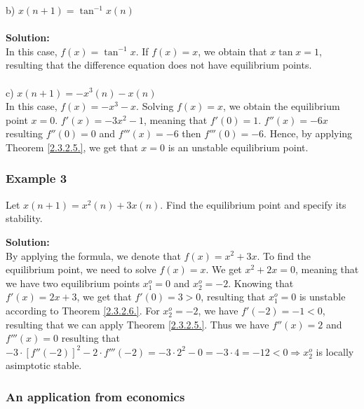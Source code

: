 \documentclass[a4paper,11pt]{report}
\begin{document}
b) $x(n+1)=\tan^{-1}{x(n)}$ \\ \\
\textbf{Solution:}\\

In this case, $f(x)=\tan^{-1}{x}$. If $f(x)=x$, we obtain that $x\tan{x}=1$, resulting that the difference equation does not have equilibrium points. \\ \\
c) $x(n+1)=-x^{3}(n)-x(n)$\\
In this case, $f(x)=-x^{3}-x$. Solving $f(x)=x$, we obtain the equilibrium point $x=0$. $f'(x)=-3x^{2}-1$, meaning that $f'(0)=1$. $f''(x)=-6x$ resulting $f''(0)=0$ and $f'''(x)=-6$ then $f'''(0)=-6$. Hence, by applying Theorem \ref{2.3.2.5.}, we get that $x=0$ is an unstable equilibrium point. 

\subsubsection{Example 3} Let $x(n+1)=x^{2}(n)+3x(n)$. Find the equilibrium point and specify its stability.

\textbf{Solution:}\\
By applying the formula, we denote that $f(x)=x^{2}+3x$. To find the equilibrium point, we need to solve $f(x)=x$. We get $x^{2}+2x=0$, meaning that we have two equilibrium points $x^{o}_{1}=0$ and $x_{2}^{o}=-2$. Knowing that $f'(x)=2x+3$, we get that $f'(0)=3>0$, resulting that $x_{1}^{o}=0$ is unstable according to Theorem \ref{2.3.2.6.}. For $x_{2}^{o}=-2$, we have $f'(-2)=-1<0$, resulting that we can apply Theorem \ref{2.3.2.5.}. Thus we have $f''(x)=2$ and $f'''(x)=0$ resulting that $-3\cdot [f''(-2)]^{2}-2\cdot f'''(-2)=-3\cdot 2^{2}-0=-3\cdot 4=-12<0 \Rightarrow x_{2}^{o}$ is locally asimptotic stable. 

\subsubsection{An application from economics} 
\end{document}
